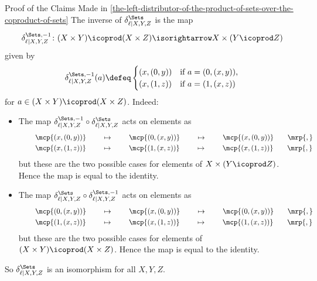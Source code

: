\begin{Proof}{Proof of the Claims Made in \cref{the-left-distributor-of-the-product-of-sets-over-the-coproduct-of-sets}}%
  The inverse of $\delta^{\Sets}_{\ell|X,Y,Z}$ is the map
  \[\delta^{\Sets,-1}_{\ell|X,Y,Z}%
        \colon%

        (X\times Y)\icoprod(X\times Z)
        \isorightarrow
        X\times(Y\icoprod Z)\]
      given by
      \[\delta^{\Sets,-1}_{\ell|X,Y,Z}(a) \defeq
        \begin{cases}
            (x,(0,y)) &\text{if $a=(0,(x,y))$,}\\
            (x,(1,z)) &\text{if $a=(1,(x,z))$}\
        \end{cases} \]
      for $a \in (X\times Y)\icoprod(X\times Z)$. Indeed:
     \begin{itemize}
       \item{}The map
             $\delta^{\Sets,-1}_{\ell|X,Y,Z} \circ \delta^{\Sets}_{\ell|X,Y,Z}$ acts on elements as
            \begin{align*}
                &\mkern40mu\mcp{(x,(0,y))}\mkern40mu \mapsto \mkern40mu\mcp{(0,(x,y))}    \mkern40mu \mapsto \mkern40mu\mcp{(x,(0,y))}\mkern35mu\mrp{,}\\
                &\mkern40mu\mcp{(x,(1,z))}\mkern40mu \mapsto \mkern40mu\mcp{(1,(x,z))}\mkern40mu \mapsto \mkern40mu\mcp{(x,(1,z))}\mkern35mu\mrp{,}\\
            \end{align*}
            but these are the two possible cases for elements of $X \times (Y \icoprod Z)$. Hence the map is equal to the identity.
        \item\SloganFont{Invertibility \rmII. }The map
             $\delta^{\Sets}_{\ell|X,Y,Z} \circ \delta^{\Sets,-1}_{\ell|X,Y,Z}$ acts on elements as
            \begin{align*}
                &\mkern40mu\mcp{(0,(x,y))}\mkern40mu \mapsto \mkern40mu\mcp{(x,(0,y))}    \mkern40mu \mapsto \mkern40mu\mcp{(0,(x,y))}\mkern35mu\mrp{,}\\
                &\mkern40mu\mcp{(1,(x,z))}\mkern40mu \mapsto \mkern40mu\mcp{(x,(1,z))}\mkern40mu \mapsto \mkern40mu\mcp{(1,(x,z))}\mkern35mu\mrp{,}\\
            \end{align*}
            but these are the two possible cases for elements of $(X \times Y) \icoprod (X \times Z)$. Hence the map is equal to the identity.
     \end{itemize}
     So $\delta^{\Sets}_{\ell|X,Y,Z}$ is an isomorphism for all $X,Y,Z$.


\end{Proof}
